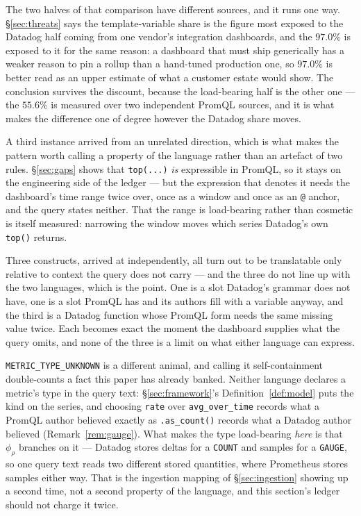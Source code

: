 The two halves of that comparison have different sources, and it runs one way.
\S\ref{sec:threats} says the template-variable share is the figure most exposed to the
Datadog half coming from one vendor's integration dashboards, and the $97.0\%$ is
exposed to it for the same reason: a dashboard that must ship generically has a weaker
reason to pin a rollup than a hand-tuned production one, so $97.0\%$ is better read as
an upper estimate of what a customer estate would show. The conclusion survives the
discount, because the load-bearing half is the other one --- the $55.6\%$ is measured
over two independent PromQL sources, and it is what makes the difference one of degree
however the Datadog share moves.

A third instance arrived from an unrelated direction, which is what makes the pattern
worth calling a property of the language rather than an artefact of two rules.
\S\ref{sec:gaps} shows that \texttt{top(...)} \emph{is} expressible in PromQL, so it stays
on the engineering side of the ledger --- but the expression that denotes it needs the
dashboard's time range twice over, once as a window and once as an \texttt{@} anchor, and
the query states neither. That the range is load-bearing rather than cosmetic is itself
measured: narrowing the window moves which series Datadog's own \texttt{top()} returns.

Three constructs, arrived at independently, all turn out to be translatable only
relative to context the query does not carry --- and the three do not line up with the
two languages, which is the point. One is a slot Datadog's grammar does not have, one is
a slot PromQL has and its authors fill with a variable anyway, and the third is a
Datadog function whose PromQL form needs the same missing value twice. Each becomes
exact the moment the dashboard supplies what the query omits, and none of the three is a
limit on what either language can express.

\texttt{METRIC\_TYPE\_UNKNOWN} is a different animal, and calling it self-containment
double-counts a fact this paper has already banked. Neither language declares a metric's
type in the query text: \S\ref{sec:framework}'s Definition~\ref{def:model} puts the kind
on the series, and choosing \texttt{rate} over \texttt{avg\_over\_time} records what a
PromQL author believed exactly as \texttt{.as\_count()} records what a Datadog author
believed (Remark~\ref{rem:gauge}). What makes the type load-bearing \emph{here} is that
$\phi_\rho$ branches on it --- Datadog stores deltas for a \texttt{COUNT} and samples
for a \texttt{GAUGE}, so one query text reads two different stored quantities, where
Prometheus stores samples either way. That is the ingestion mapping of
\S\ref{sec:ingestion} showing up a second time, not a second property of the language,
and this section's ledger should not charge it twice.

